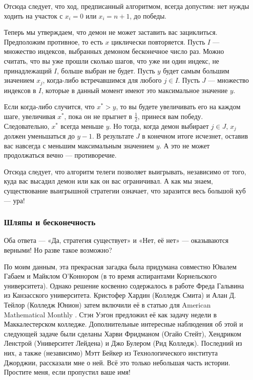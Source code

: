 Отсюда следует, что ход, предписанный алгоритмом, всегда допустим:
нет нужды ходить на участок с $x_i = 0$ или $x_i = n + 1$, до победы.

Теперь мы утверждаем, что демон не может заставить вас зациклиться.
Предположим противное, то есть $x$ циклически повторяется.
Пусть $I$ --- множество индексов, выбранных демоном бесконечное число раз.
Можно считать, что вы уже прошли сколько шагов, что уже ни один индекс, не принадлежащий $I$, больше выбран не будет.
Пусть $y$ будет самым большим значением $x_j$, когда-либо встречавшимся для любого $j \in I$.
Пусть $J$ --- множество индексов в $I$, которые в данный момент имеют это максимальное значение $y$.

Если когда-либо случится, что $x^* > y$, то вы будете увеличивать его на каждом шаге, увеличивая $x^*$, пока он не прыгнет в $\tfrac12$, принеся вам победу.
Следовательно, $x^*$ всегда меньше $y$.
Но тогда, когда демон выбирает $j \in J$, $x_j$ должен уменьшаться до $y - 1$.
В результате $J$ в конечном итоге исчезнет, оставив вас навсегда с меньшим максимальным значением $y$.
А это не может продолжаться вечно --- противоречие.

Отсюда следует, что алгоритм телеги позволяет выигрывать, независимо от того, куда вас высадил демон или как он вас ограничивал.
А как мы знаем, существование выигрышной стратегии означает, что заразится весь большой куб --- ура!

\subsubsection*{Шляпы и бесконечность}

Оба ответа --- «Да, стратегия существует» и «Нет, её нет» --- оказываются верными!
Но разве такое возможно?

По моим данным, эта прекрасная загадка была придумана совместно Ювалем Габаем и Майклом О'Коннором (в то время аспирантами Корнельского университета).
Однако решение косвенно содержалось в работе Фреда Гальвина из Канзасского университета.
Кристофер Хардин (Колледж Смита) и Алан Д. Тейлор (Колледж Юнион) затем включили её в статью для American Mathematical Monthly \cite{36}.
Стэн Уэгон предложил её как задачу недели в Маккалестерском колледже.
Дополнительные интересные наблюдения об этой и следующей задаче были сделаны Харви Фридманом (Огайо Стейт), Хендриком Ленстрой (Университет Лейдена) и Джо Булером (Рид Колледж).
Последний из них, а также (независимо) Мэтт Бейкер из Технологического института Джорджии, рассказали мне о ней.
Всё это только небольшая часть истории.
Простите меня, если пропустил ваше имя!

